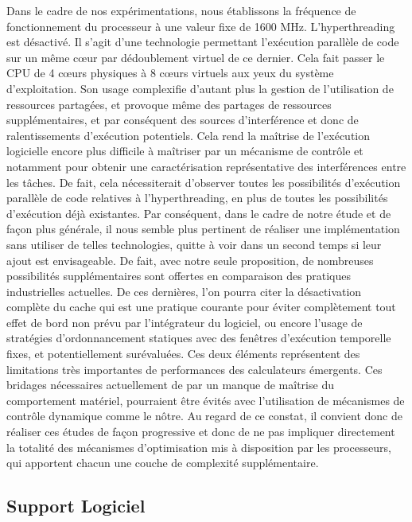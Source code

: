 \documentclass[french, a4paper, 11pt, twoside, pdftex]{StyleThese}
\begin{document}
		Dans le cadre de nos expérimentations, nous établissons la fréquence de fonctionnement du processeur à une valeur fixe de 1600 MHz. L'hyperthreading est désactivé. Il s'agit d'une technologie permettant l'exécution parallèle de code sur un même cœur par dédoublement virtuel de ce dernier. Cela fait passer  le CPU de 4 cœurs physiques à 8 cœurs virtuels aux yeux du système d'exploitation. Son usage complexifie d'autant plus la gestion de l'utilisation de ressources partagées, et provoque même des partages de ressources supplémentaires, et par conséquent des sources d'interférence et donc de ralentissements d'exécution potentiels. Cela rend la maîtrise de l'exécution logicielle encore plus difficile à maîtriser par un mécanisme de contrôle et notamment pour obtenir une caractérisation représentative des interférences entre les tâches. De fait, cela nécessiterait d'observer toutes les possibilités d'exécution parallèle de code relatives à l'hyperthreading, en plus de toutes les possibilités d'exécution déjà existantes. Par conséquent, dans le cadre de notre étude et de façon plus générale, il nous semble plus pertinent de réaliser une implémentation sans utiliser de telles technologies, quitte à voir dans un second temps si leur ajout est envisageable.
		De fait, avec notre seule proposition, de nombreuses possibilités supplémentaires sont offertes en comparaison des pratiques industrielles actuelles. De ces dernières, l'on pourra citer la désactivation complète du cache qui est une pratique courante pour éviter complètement tout effet de bord non prévu par l'intégrateur du logiciel, ou encore l'usage de stratégies d'ordonnancement statiques avec des fenêtres d'exécution temporelle fixes, et potentiellement surévaluées. Ces deux éléments représentent des limitations très importantes de performances des calculateurs émergents. Ces bridages nécessaires actuellement de par un manque de maîtrise du comportement matériel, pourraient être évités avec l'utilisation de mécanismes de contrôle dynamique comme le nôtre. 
		Au regard de ce constat, il convient donc de réaliser ces études de façon progressive et donc de ne pas impliquer directement la totalité des mécanismes d'optimisation mis à disposition par les processeurs, qui apportent chacun une couche de complexité supplémentaire.
		
        \subsection{Support Logiciel}
        
\end{document}
